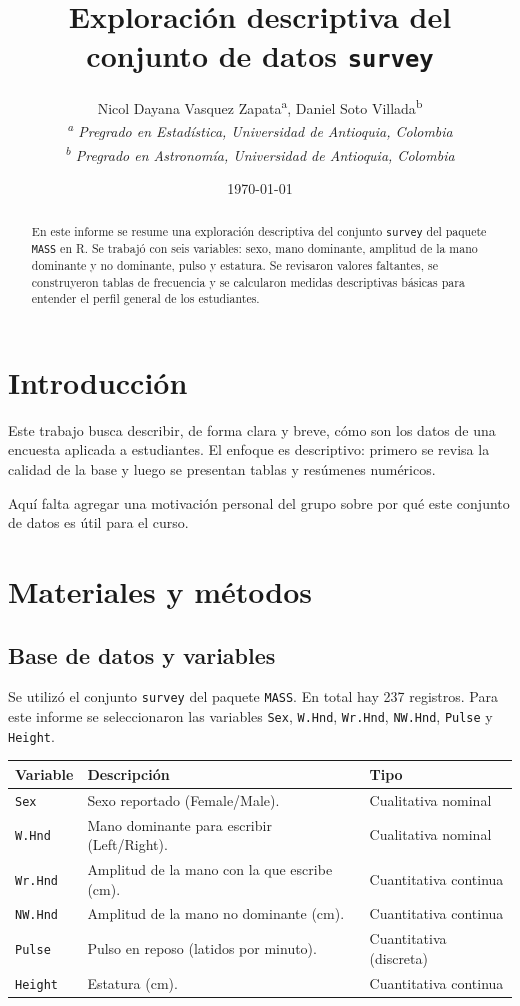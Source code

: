 \documentclass[11pt]{article}
\title{Exploración descriptiva del conjunto de datos \texttt{survey}}
\author{Nicol Dayana Vasquez Zapata\textsuperscript{a}, Daniel Soto Villada\textsuperscript{b}\\[0.6em]{\small\textit{\textsuperscript{a} Pregrado en Estadística, Universidad de Antioquia, Colombia}}\\{\small\textit{\textsuperscript{b} Pregrado en Astronomía, Universidad de Antioquia, Colombia}}}
\date{\today}
\begin{document}
\maketitle

\begin{abstract}
En este informe se resume una exploración descriptiva del conjunto \texttt{survey} del paquete \texttt{MASS} en R. Se trabajó con seis variables: sexo, mano dominante, amplitud de la mano dominante y no dominante, pulso y estatura. Se revisaron valores faltantes, se construyeron tablas de frecuencia y se calcularon medidas descriptivas básicas para entender el perfil general de los estudiantes.
\end{abstract}

\section{Introducción}
Este trabajo busca describir, de forma clara y breve, cómo son los datos de una encuesta aplicada a estudiantes. El enfoque es descriptivo: primero se revisa la calidad de la base y luego se presentan tablas y resúmenes numéricos.

Aquí falta agregar una motivación personal del grupo sobre por qué este conjunto de datos es útil para el curso.

\section{Materiales y métodos}
\subsection{Base de datos y variables}
Se utilizó el conjunto \texttt{survey} del paquete \texttt{MASS}. En total hay 237 registros. Para este informe se seleccionaron las variables \texttt{Sex}, \texttt{W.Hnd}, \texttt{Wr.Hnd}, \texttt{NW.Hnd}, \texttt{Pulse} y \texttt{Height}.

\begin{center}
\renewcommand{\arraystretch}{1.15}
\begin{tabularx}{\textwidth}{@{}lXl@{}}
\toprule
\textbf{Variable} & \textbf{Descripción} & \textbf{Tipo} \\
\midrule
\texttt{Sex} & Sexo reportado (Female/Male). & Cualitativa nominal \\
\texttt{W.Hnd} & Mano dominante para escribir (Left/Right). & Cualitativa nominal \\
\texttt{Wr.Hnd} & Amplitud de la mano con la que escribe (cm). & Cuantitativa continua \\
\texttt{NW.Hnd} & Amplitud de la mano no dominante (cm). & Cuantitativa continua \\
\texttt{Pulse} & Pulso en reposo (latidos por minuto). & Cuantitativa (discreta) \\
\texttt{Height} & Estatura (cm). & Cuantitativa continua \\
\bottomrule
\end{tabularx}
\end{center}
\end{document}

